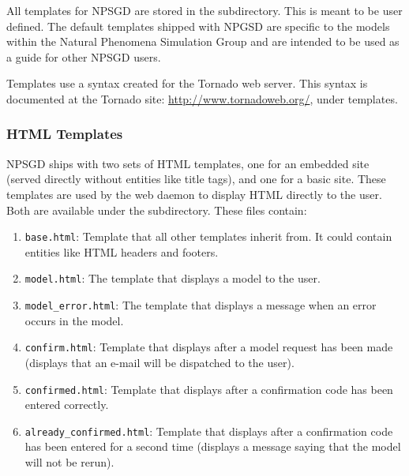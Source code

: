 \documentclass{article}
\begin{document}
All templates for NPSGD are stored in the  subdirectory. This
is meant to be user defined. The default templates shipped with NPGSD are 
specific to the models within the Natural Phenomena Simulation Group and are
intended to be used as a guide for other NPSGD users.

Templates use a syntax created for the Tornado web server. This syntax is
documented at the Tornado site: \url{http://www.tornadoweb.org/}, under
templates.

\subsubsection{HTML Templates}
NPSGD ships with two sets of HTML templates, one for an embedded site (served
directly without entities like title tags), and one for a basic site. These
templates are used by the web daemon to display HTML directly to the user. Both are
available under the  subdirectory. These files contain:
\begin{enumerate}
    \item \texttt{base.html}: Template that all other templates inherit from.
    It could contain entities like HTML headers and footers.

    \item \texttt{model.html}: The template that displays a model to the user.

    \item \texttt{model\_error.html}: The template that displays a message when
    an error occurs in the model.

    \item \texttt{confirm.html}: Template that displays after a model request has
    been made (displays that an e-mail will be dispatched to the user).

    \item \texttt{confirmed.html}: Template that displays after a confirmation code
    has been entered correctly.

    \item \texttt{already\_confirmed.html}: Template that displays after a
    confirmation code has been entered for a second time (displays a
    message saying that the model will not be rerun).
\end{enumerate}
\end{document}

